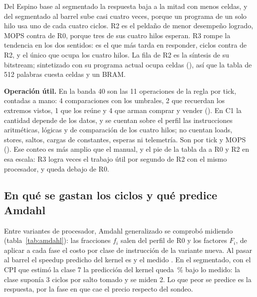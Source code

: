 \begin{table}[H]\centering
\caption{La escalera de co-diseño: recursos, respuesta, CPI y desempeño logrado de cada peldaño.}\label{tab:escalera}
\par\smallskip

\end{table}

Del Espino base al segmentado la respuesta baja a la mitad con menos celdas, y del segmentado al barrel sube casi cuatro veces, porque un programa de un solo hilo usa uno de cada cuatro ciclos. R2 es el peldaño de menor desempeño logrado, \ctresRdosMops{} MOPS contra \ctresRceroMops{} de R0, porque tres de sus cuatro hilos esperan. R3 rompe la tendencia en los dos sentidos: es el que más tarda en responder, \ctresRespPeor{} ciclos contra \ctresRdosRespPeor{} de R2, y el único que ocupa los cuatro hilos. La fila de R2 es la síntesis de su bitstream; sintetizado con su programa actual ocupa \ctresCeldasRdosMismaSintesis{} celdas (), así que la tabla de 512 palabras cuesta \ctresCeldasSobreRdos{} celdas y un BRAM.

\textbf{Operación útil.} En la banda 40 son las 11 operaciones de la regla por tick, contadas a mano: 4 comparaciones con los umbrales, 2 que recuerdan los extremos vistos, 1 que los reúne y 4 que arman comprar y vender (). En C1 la cantidad depende de los datos, y se cuentan sobre el perfil las instrucciones aritméticas, lógicas y de comparación de los cuatro hilos; no cuentan loads, stores, saltos, cargas de constantes, esperas ni telemetría. Son \ctresOps{} por tick y \ctresMops{} MOPS (). Ese conteo es más amplio que el manual, y el pie de la tabla da a R0 y R2 en esa escala: R3 logra \ctresMopsSobreRdos{} veces el trabajo útil por segundo de R2 con el mismo procesador, y queda debajo de R0.

\subsection{En qué se gastan los ciclos y qué predice Amdahl}

Entre variantes de procesador, Amdahl generalizado se comprobó midiendo (tabla~\ref{tab:amdahl}): las fracciones $f_i$ salen del perfil de R0 y los factores $F_i$, de aplicar a cada fase el costo por clase de instrucción de la variante nueva. Al pasar al barrel el speedup predicho del kernel es \ctresAmdahlBarrelPred{} y el medido \ctresAmdahlBarrelMed. En el segmentado, con el CPI que estimó la clase 7 la predicción del kernel queda \pCotasAmdahlErrKernelSegClase\,\% bajo lo medido: la clase suponía 3 ciclos por salto tomado y se miden 2. Lo que peor se predice es la respuesta, por la fase en que cae el precio respecto del sondeo.

